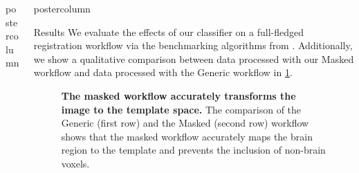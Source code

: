 \begin{frame}
\begin{columns}
\begin{column}{.42\textwidth}
\begin{beamercolorbox}[center]{postercolumn}
\begin{minipage}{.98\textwidth}
{                        }

                    \end{minipage}
                \end{beamercolorbox}
            \end{column}
            \begin{column}{.59\textwidth}
                \begin{beamercolorbox}[center]{postercolumn}
                    \begin{minipage}{.95\textwidth} %
                        \parbox[t][\columnheight]{\textwidth}{ %


                            \begin{myblock}{Results}
                                We evaluate the effects of our classifier on a full-fledged registration workflow via the benchmarking algorithms from \cite{irsabi}.
                                Additionally, we show a qualitative comparison between data processed with our Masked workflow and data processed with the Generic workflow in \cref{reg_comp}.
                                \begin{figure}
                                    \centering
                                    \caption{\textbf{The masked workflow accurately transforms the image to the template space.} The comparison of the Generic (first row) and the Masked (second row) workflow shows that the masked workflow accurately maps the brain region to the template and prevents the inclusion of non-brain voxels.}
                                    \label{reg_comp}
                                \end{figure}



\end{myblock}}
\end{minipage}
\end{beamercolorbox}
\end{column}
\end{columns}
\end{frame}

